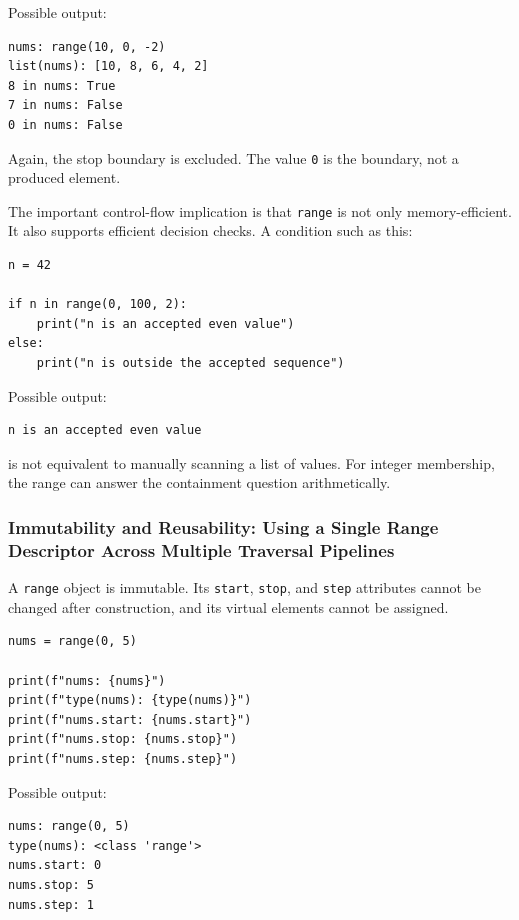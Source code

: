 \documentclass[a4paper,twoside]{report}
\begin{document}
Possible output:

\begin{verbatim}
nums: range(10, 0, -2)
list(nums): [10, 8, 6, 4, 2]
8 in nums: True
7 in nums: False
0 in nums: False
\end{verbatim}

Again, the stop boundary is excluded. The value \texttt{0} is the boundary, not a produced element.

The important control-flow implication is that \texttt{range} is not only memory-efficient. It also supports efficient decision checks. A condition such as this:

\begin{verbatim}
n = 42

if n in range(0, 100, 2):
    print("n is an accepted even value")
else:
    print("n is outside the accepted sequence")
\end{verbatim}

Possible output:

\begin{verbatim}
n is an accepted even value
\end{verbatim}

is not equivalent to manually scanning a list of values. For integer membership, the range can answer the containment question arithmetically.

\subsubsection{Immutability and Reusability: Using a Single Range Descriptor Across Multiple Traversal Pipelines}

A \texttt{range} object is immutable. Its \texttt{start}, \texttt{stop}, and \texttt{step} attributes cannot be changed after construction, and its virtual elements cannot be assigned.

\begin{verbatim}
nums = range(0, 5)

print(f"nums: {nums}")
print(f"type(nums): {type(nums)}")
print(f"nums.start: {nums.start}")
print(f"nums.stop: {nums.stop}")
print(f"nums.step: {nums.step}")
\end{verbatim}

Possible output:

\begin{verbatim}
nums: range(0, 5)
type(nums): <class 'range'>
nums.start: 0
nums.stop: 5
nums.step: 1
\end{verbatim}
\end{document}
